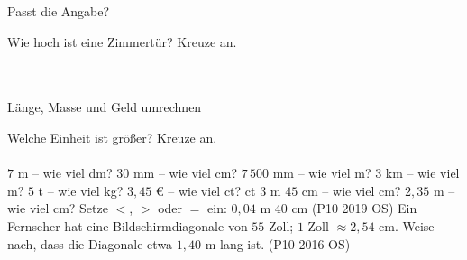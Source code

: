 \setcounter{aufgabe}{13}

\begin{aufgabe}{Passt die Angabe?}
\begin{teile}
\teil Wie hoch ist eine Zimmertür? Kreuze an.\\ \\ \\ 
\end{teile}
\end{aufgabe}

\begin{aufgabe}{Länge, Masse und Geld umrechnen}
\begin{teile}
\teil Welche Einheit ist größer? Kreuze an.\\ \\ 
\teil $7$ m – wie viel dm? \leerfeld[dm]
\teil $30$ mm – wie viel cm? \leerfeld[cm]
\teil $7\,500$ mm – wie viel m? \leerfeld[m]
\teil $3$ km – wie viel m? \leerfeld[m]
\teil $5$ t – wie viel kg? \leerfeld[kg]
\teil $3{,}45$ € – wie viel ct? \leerfeld ct
\teil $3$ m $45$ cm – wie viel cm? \leerfeld[cm]
\teil $2{,}35$ m – wie viel cm? \leerfeld[cm]
\teil Setze $<$, $>$ oder $=$ ein: $0{,}04$ m \leerfeld $40$ cm \hfill (P10 2019 OS)
\teil Ein Fernseher hat eine Bildschirmdiagonale von $55$ Zoll; $1$ Zoll $\approx 2{,}54$ cm. Weise nach, dass die Diagonale etwa $1{,}40$ m lang ist. \hfill (P10 2016 OS)
\end{teile}
\end{aufgabe}

